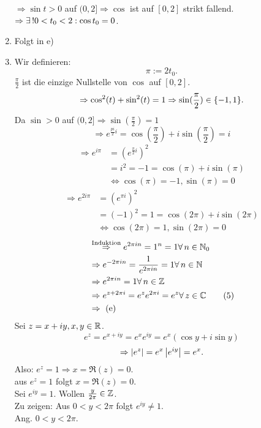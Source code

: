 \documentclass[../ana2.tex]{subfiles}
\begin{document}
\begin{bew}
\begin{enumerate}[label=(\alph*)]
\( \Rightarrow \sin t > 0 \) auf \( (0,2] 
\Rightarrow \cos \) ist auf \( [0,2] \) strikt fallend. \\
\( \Rightarrow \existse 0 < t_0 < 2: \cos t_0 = 0 \).\\
\item Folgt in e)
\item Wir definieren:
\[ \pi := 2 t_0. \]
\( \frac{\pi}{2} \) ist die einzige Nullstelle 
von \( \cos \) auf \( [0,2] \).\\
\[ \Rightarrow \cos^2(t) + \sin^2(t) = 1 
\Rightarrow \sin(\frac{\pi}{2}) \in \{-1, 1\}. \]
Da \( \sin > 0 \) auf \( (0, 2] \Rightarrow \sin(\frac{\pi}{2}) = 1 \)
\[ \Rightarrow e^{\frac{pi}{2} i} 
= \cos(\frac{\pi}{2}) + i \sin(\frac{\pi}{2}) = i \tag{4} \]
\begin{align*}
    \Rightarrow e^{i\pi} &= (e^{\frac{\pi}{2}i})^2 \\
    &= i^2 = -1 = \cos(\pi) + i\sin (\pi) \\
    &\Leftrightarrow \cos(\pi) = -1, \sin(\pi) = 0
\end{align*}
\begin{align*}
    \Rightarrow e^{2i\pi} &= (e^{\pi i})^2 \\
    &= (-1)^2 = 1 = \cos(2\pi) + i\sin(2\pi) \\ 
    &\Leftrightarrow \cos(2\pi) = 1, \sin(2\pi) = 0
\end{align*}
\begin{align*}
    &\oversett{Induktion}{\Rightarrow} e^{2 \pi i n} = 1^n 
    = 1 \forall n\in\N_0 \\
    &\Rightarrow e^{-2\pi i n} = \frac{1}{e^{2 \pi i n}} 
    = 1 \forall n\in\N \\
    &\Rightarrow e^{2 \pi i n} = 1 \forall n \in \Z \\
    &\Rightarrow e^{z + 2 \pi i} = e^z e^{2\pi i} 
    = e^z \forall z\in\C \tag{5} \\
    &\Rightarrow \text{ (e)}
\end{align*}
Sei \( z = x + iy, x,y \in\mathbb{R} \).
\[ e^z = e^{x+iy} = e^x e^{iy} = e^x(\cos y + i \sin y) \]
\[ \Rightarrow \left|e^z\right| = e^x \left|e^{iy}\right| = e^x. \]
Also: \( e^z = 1 \Rightarrow x = \Re(z) = 0 \).\\
\Dphp{} aus \( e^z = 1 \) folgt \(x = \Re(z) = 0 \).\\
Sei \( e^{iy} = 1 \). Wollen \( \frac{y}{2\pi} \in \mathbb{Z} \).\\
Zu zeigen: Aus \( 0 < y < 2\pi \) folgt \( e^{iy} \neq 1 \).\\
Ang. \( 0 < y < 2\pi \). \\

\end{enumerate}
\end{bew}
\end{document}
